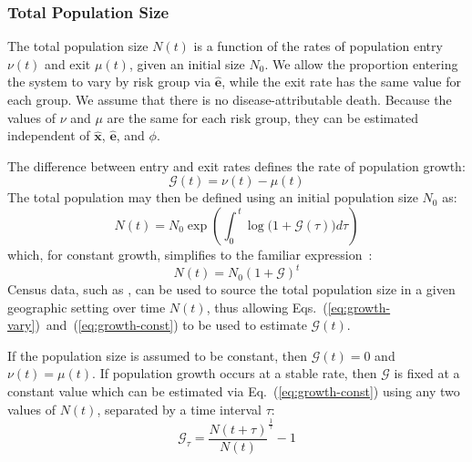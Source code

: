 \subsubsection{Total Population Size}\label{sss:params-nu-mu}
The total population size $N(t)$ is a function of
the rates of population entry $\nu(t)$ and exit $\mu(t)$, given an initial size $N_0$.
We allow the proportion entering the system to vary by risk group via $\bm{\hat{e}}$,
while the exit rate has the same value for each group.
We assume that there is no disease-attributable death.
Because the values of $\nu$ and $\mu$ are the same for each risk group, 
they can be estimated independent of
$\bm{\hat{x}}$, $\bm{\hat{e}}$, and $\phi$.
\par
The difference between entry and exit rates
defines the rate of population growth:
\begin{equation}\label{eq:growth-G}
\mathcal{G}(t) = \nu(t) - \mu(t) 
\end{equation}
The total population may then be defined using an initial population size $N_0$ as:
\begin{equation}\label{eq:growth-vary}
  N(t) = N_0 \exp{\left(\int_{0}^{\,t}{\log\big(1+\mathcal{G}(\tau) \big)d\tau}\right)}
\end{equation}
which, for constant growth, simplifies to the familiar expression~\citep{Malthus1798}:
\begin{equation} \label{eq:growth-const}
  N(t) = N_0 {(1 + \mathcal{G})}^{t}
\end{equation}
Census data, such as \citep{WorldBank}, can be used to source
the total population size in a given geographic setting over time $N(t)$,
thus allowing Eqs.~(\ref{eq:growth-vary})~and~(\ref{eq:growth-const})
to be used to estimate $\mathcal{G}(t)$.
\par
If the population size is assumed to be constant,
then $\mathcal{G}(t) = 0$ and $\nu(t) = \mu(t)$.
If population growth occurs at a stable rate, then
$\mathcal{G}$ is fixed at a constant value
which can be estimated via Eq.~(\ref{eq:growth-const})
using any two values of $N(t)$, separated by a time interval $\tau$:
\begin{equation}\label{eq:growth-backwards}
\mathcal{G}_{\tau} = {\frac{N(t+\tau)}{N(t)}}^{\frac{1}{\tau}} -1
\end{equation}
